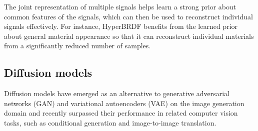 The joint representation of multiple signals helps learn a strong prior about common features of the signals, which can then be used to reconstruct individual signals effectively. For instance, HyperBRDF benefits from the learned prior about general material appearance so that it can reconstruct individual materials from a significantly reduced number of samples.  



\subsection{Diffusion models}
Diffusion models have emerged as an alternative to generative adversarial networks (GAN) and variational autoencoders (VAE) on the image generation domain and recently surpassed their performance in related computer vision tasks, such as conditional generation and image-to-image translation. 